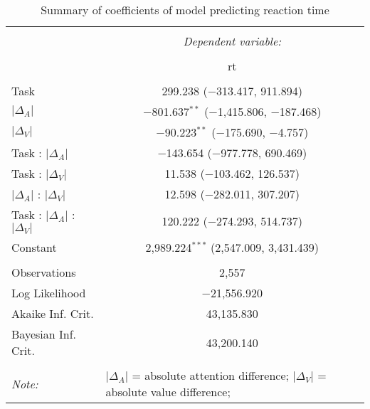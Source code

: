 
\begin{table}[t] \centering 
  \caption{Summary of coefficients of model predicting reaction time} 
  \label{table:rtModel} 
\begin{tabular}{@{\extracolsep{5pt}}lc} 
\\[-1.8ex]\hline 
\hline \\[-1.8ex] 
 & \multicolumn{1}{c}{\textit{Dependent variable:}} \\ 
\cline{2-2} 
\\[-1.8ex] & rt \\ 
\hline \\[-1.8ex] 
 Task & 299.238 ($-$313.417, 911.894) \\ 
  $\vert\Delta_A\vert$ & $-$801.637$^{**}$ ($-$1,415.806, $-$187.468) \\ 
  $\vert\Delta_V\vert$ & $-$90.223$^{**}$ ($-$175.690, $-$4.757) \\ 
  Task : $\vert\Delta_A\vert$ & $-$143.654 ($-$977.778, 690.469) \\ 
  Task : $\vert\Delta_V\vert$ & 11.538 ($-$103.462, 126.537) \\ 
  $\vert\Delta_A\vert$ : $\vert\Delta_V\vert$ & 12.598 ($-$282.011, 307.207) \\ 
  Task : $\vert\Delta_A\vert$ :  $\vert\Delta_V\vert$ & 120.222 ($-$274.293, 514.737) \\ 
  Constant & 2,989.224$^{***}$ (2,547.009, 3,431.439) \\ 
 \hline \\[-1.8ex] 
Observations & 2,557 \\ 
Log Likelihood & $-$21,556.920 \\ 
Akaike Inf. Crit. & 43,135.830 \\ 
Bayesian Inf. Crit. & 43,200.140 \\ 
\hline 
\hline \\[-1.8ex] 
\textit{Note:}  & \multicolumn{1}{l}{\footnotesize $\vert\Delta_A\vert$ = absolute attention difference; $\vert\Delta_V\vert$ = absolute value difference; } \\ 
\end{tabular} 
\end{table} 
